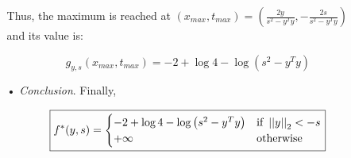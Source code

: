 \documentclass[a4paper, 11pt]{report}
\begin{document}
\begin{itemize}
\begin{itemize}
    Thus, the maximum is reached at $\left( x_{max}, t_{max} \right) = \left( \frac{2y}{s^{2} - y^{T}y}, - \frac{2s}{s^{2} - y^{T}y} \right)$ and its value is:
    
    \[ g_{y, s} \left( x_{max}, t_{max} \right) = -2 + \log 4 - \log \left( s^{2} - y^{T}y \right) \]
    
    \item[•] \textit{Conclusion}. Finally,

    \[ \boxed{f^{*}(y, s) =
    \begin{cases}
        -2 + \log 4 - \log \left( s^{2} - y^{T}y \right) & \text{if } \left|\left| y \right|\right|_{2} < -s \\
        + \infty & \text{otherwise}
    \end{cases}} \]

    \end{itemize}
\end{itemize}
\end{document}

